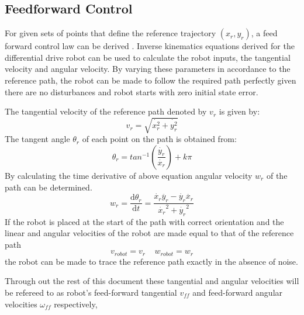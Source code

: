 \documentclass[conference]{IEEEtran}
\begin{document}
\subsection{Feedforward Control}
For given sets of points that define the reference trajectory $ (x_{r} , y_{r}) $, a feed forward control law can be derived \cite{chung2001position}. Inverse kinematics equations derived for the differential drive robot can be used to calculate the robot inputs, the tangential velocity and angular velocity. By varying these parameters in accordance to the reference path, the robot can be made to follow the required path perfectly given there are no disturbances and robot starts with zero initial state error.

The tangential velocity of the reference path denoted by $v_{r}$ is given by:
\begin{equation}\label{eq}
v_{r} = \sqrt{\dot{x_{r}^{2}} + \dot{y_{r}^{2}}}
\end{equation}
The tangent angle $\theta_{r}$ of each point on the path is obtained from:
\begin{equation}\label{eq}
\theta_{r} = tan^{-1}(\frac{\dot{y_{r}}}{\dot{{x_{r}}}}) + k\pi
\end{equation}
By calculating the time derivative of above equation angular velocity $w_{r}$ of the path can be determined.
\begin{equation}\label{eq}
w_{r} = \frac{\mathrm{d} \theta_{r}}{\mathrm{d} t} = \frac{\dot{x_{r}}\ddot{y_{r}} - \dot{y_{r}}\ddot{x_{r}}}{\dot{x_{r}}^{2}+\dot{y_{r}}^{2}}
\end{equation}
If the robot is placed at the start of the path with correct orientation and the linear and angular velocities of the robot are made equal to that of the reference path
\begin{equation}\label{eq}
v_{robot} = v_{r}  \;\;\;\;  w_{robot} = w_{r}
\end{equation}
the robot can be made to trace the reference path exactly in the absence of noise.

Through out the rest of this document these tangential and angular velocities will be refereed to as robot's feed-forward tangential $v_{ff}$ and feed-forward angular velocities $\omega_{ff}$ respectively,
\end{document}
